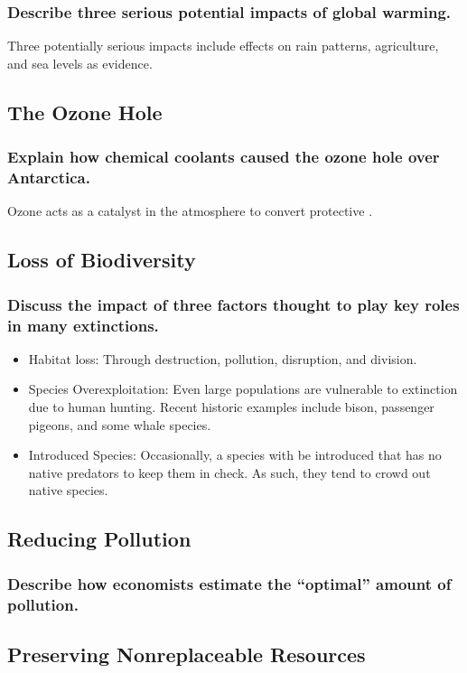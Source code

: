 \documentclass[a4paper]{article}
\begin{document}
\subsubsection{Describe three serious potential impacts of global warming.}
Three potentially serious impacts include effects on rain patterns, agriculture, and sea levels as evidence.

\subsection{The Ozone Hole}
\subsubsection{Explain how chemical coolants caused the ozone hole over Antarctica.}
Ozone acts as a catalyst in the atmosphere to convert protective .

\subsection{Loss of Biodiversity}
\subsubsection{Discuss the impact of three factors thought to play key roles in many extinctions.}
\begin{itemize}
    \item Habitat loss: Through destruction, pollution, disruption, and division.
    \item Species Overexploitation: Even large populations are vulnerable to extinction due to human hunting. Recent historic examples include bison, passenger pigeons, and some whale species.
    \item Introduced Species: Occasionally, a species with be introduced that has no native predators to keep them in check. As such, they tend to crowd out native species.
\end{itemize}

\subsection{Reducing Pollution}
\subsubsection{Describe how economists estimate the “optimal” amount of pollution.}


\subsection{Preserving Nonreplaceable Resources}
\end{document}
